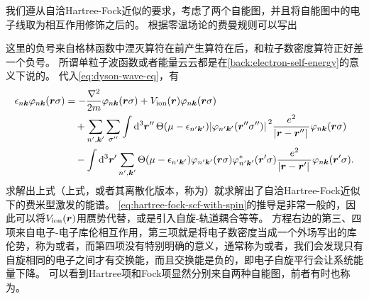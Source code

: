 我们遵从自洽Hartree-Fock近似的要求，考虑了两个自能图，并且将自能图中的电子线取为相互作用修饰之后的。
根据零温场论的费曼规则可以写出

这里的负号来自格林函数中湮灭算符在前产生算符在后，和粒子数密度算符正好差一个负号。
所谓单粒子波函数或者能量云云都是在\autoref{back:electron-self-energy}的意义下说的。
代入\eqref{eq:dyson-wave-eq}，有
\begin{equation}
    \begin{aligned}
        \epsilon_{n \vb*{k}} \varphi_{n \vb*{k}}(\vb*{r} \sigma) &= - \frac{\laplacian}{2m} \varphi_{n \vb*{k}}(\vb*{r} \sigma) + V_\text{ion}(\vb*{r}) \varphi_{n \vb*{k}}(\vb*{r} \sigma) \\
        &\quad +  \sum_{n', \vb*{k}'} \sum_{\sigma''} \int \dd[3]{\vb*{r}''} \Theta(\mu - \epsilon_{n' \vb*{k}'}) \abs*{\varphi_{n' \vb*{k}'}(\vb*{r}'' \sigma'')}^2 \frac{e^2}{\abs*{\vb*{r} - \vb*{r}''}} \varphi_{n \vb*{k}}(\vb*{r} \sigma) \\
        &\quad - \int \dd[3]{\vb*{r}'} \sum_{n', \vb*{k}'} \Theta(\mu - \epsilon_{n' \vb*{k}'}) \varphi_{n' \vb*{k}'}(\vb*{r} \sigma) \varphi^*_{n' \vb*{k}'}(\vb*{r}' \sigma) \frac{e^2}{\abs*{\vb*{r} - \vb*{r}'}} \varphi_{n \vb*{k}}(\vb*{r}' \sigma) .
    \end{aligned}
    \label{eq:hartree-fock-scf-with-spin}
\end{equation}
求解出上式（上式，或者其离散化版本，称为）就求解出了自洽Hartree-Fock近似下的费米型激发的能谱。
\eqref{eq:hartree-fock-scf-with-spin}的推导是非常一般的，因此可以将$V_\text{ion}(\vb*{r})$用赝势代替，或是引入自旋-轨道耦合等等。
方程右边的第三、四项来自电子-电子库伦相互作用，第三项就是将电子数密度当成一个外场写出的库伦势，称为或者，而第四项没有特别明确的意义，通常称为或者，我们会发现只有自旋相同的电子之间才有交换能，而且交换能是负的，即电子自旋平行会让系统能量下降。
可以看到Hartree项和Fock项显然分别来自两种自能图，前者有时也称为。


